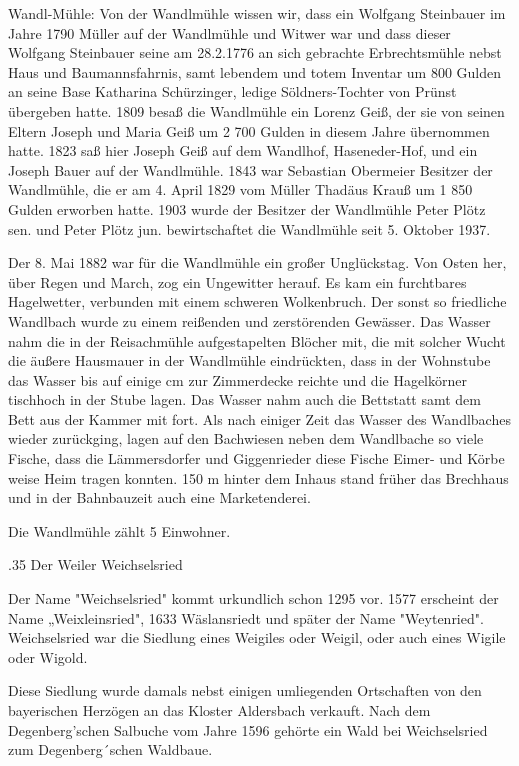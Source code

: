 Wandl-Mühle: Von der Wandlmühle wissen wir, dass ein Wolfgang Steinbauer im
Jahre 1790 Müller auf der Wandlmühle und Witwer war und dass dieser Wolfgang
Steinbauer seine am 28.2.1776 an sich gebrachte Erbrechtsmühle nebst Haus und
Baumannsfahrnis, samt lebendem und totem Inventar um 800 Gulden an seine Base
Katharina Schürzinger, ledige Söldners-Tochter von Prünst übergeben hatte. 1809
besaß die Wandlmühle ein Lorenz Geiß, der sie von seinen Eltern Joseph und Maria
Geiß um 2 700 Gulden in diesem Jahre übernommen hatte. 1823 saß hier Joseph Geiß
auf dem Wandlhof, Haseneder-Hof, und ein Joseph Bauer auf der Wandlmühle. 1843
war Sebastian Obermeier Besitzer der Wandlmühle, die er am 4. April 1829 vom
Müller Thadäus Krauß um 1 850 Gulden erworben hatte. 1903 wurde der Besitzer der
Wandlmühle Peter Plötz sen. und Peter Plötz jun. bewirtschaftet die Wandlmühle
seit 5. Oktober 1937.

Der 8. Mai 1882 war für die Wandlmühle ein großer Unglückstag. Von Osten her,
über Regen und March, zog ein Ungewitter herauf. Es kam ein furchtbares
Hagelwetter, verbunden mit einem schweren Wolkenbruch. Der sonst so friedliche
Wandlbach wurde zu einem reißenden und zerstörenden Gewässer. Das Wasser nahm
die in der Reisachmühle aufgestapelten Blöcher mit, die mit solcher Wucht die
äußere Hausmauer in der Wandlmühle eindrückten, dass in der Wohnstube das Wasser
bis auf einige cm zur Zimmerdecke reichte und die Hagelkörner tischhoch in der
Stube lagen. Das Wasser nahm auch die Bettstatt samt dem Bett aus der Kammer mit
fort. Als nach einiger Zeit das Wasser des Wandlbaches wieder zurückging, lagen
auf den Bachwiesen neben dem Wandlbache so viele Fische, dass die Lämmersdorfer
und Giggenrieder diese Fische Eimer- und Körbe weise Heim tragen konnten. 150 m
hinter dem Inhaus stand früher das Brechhaus und in der Bahnbauzeit auch eine
Marketenderei.

Die Wandlmühle zählt 5 Einwohner.

.35 Der Weiler Weichselsried

Der Name "Weichselsried" kommt urkundlich schon 1295 vor. 1577 erscheint der
Name „Weixleinsried", 1633 Wäslansriedt und später der Name "Weytenried".
Weichselsried war die Siedlung eines Weigiles oder Weigil, oder auch eines
Wigile oder Wigold.

Diese Siedlung wurde damals nebst einigen umliegenden Ortschaften von den
bayerischen Herzögen an das Kloster Aldersbach verkauft. Nach dem
Degenberg'schen Salbuche vom Jahre 1596 gehörte ein Wald bei Weichselsried zum
Degenberg´schen Waldbaue.

